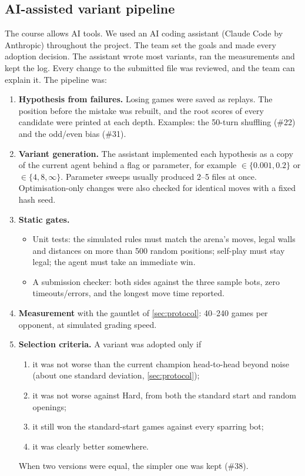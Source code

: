 \subsection{AI-assisted variant pipeline}
\label{sec:pipeline}
The course allows AI tools. We used an AI coding assistant (Claude Code by Anthropic) throughout
the project. The team set the goals and made every adoption decision. The assistant wrote most
variants, ran the measurements and kept the log. Every change to the submitted file was reviewed,
and the team can explain it. The pipeline was:
\begin{enumerate}
  \item \textbf{Hypothesis from failures.} Losing games were saved as replays. The position
        before the mistake was rebuilt, and the root scores of every candidate were printed at
        each depth. Examples: the 50-turn shuffling (\#22) and the odd/even bias (\#31).
  \item \textbf{Variant generation.} The assistant implemented each hypothesis as a copy of the
        current agent behind a flag or parameter, for example 
        $\in\{0.001, 0.2\}$ or  $\in\{4, 8, \infty\}$. Parameter sweeps usually
        produced 2--5 files at once. Optimisation-only changes were also checked for identical
        moves with a fixed hash seed.
  \item \textbf{Static gates.}
        \begin{itemize}
          \item Unit tests: the simulated rules must match the arena's moves, legal walls and
                distances on more than 500 random positions; self-play must stay legal; the
                agent must take an immediate win.
          \item A submission checker: both sides against the three sample bots, zero
                timeouts/errors, and the longest move time reported.
        \end{itemize}
  \item \textbf{Measurement} with the gauntlet of \cref{sec:protocol}: 40--240 games per
        opponent, at simulated grading speed.
  \item \textbf{Selection criteria.} A variant was adopted only if
        \begin{enumerate}[label=(\alph*)]
          \item it was not worse than the current champion head-to-head beyond noise (about one
                standard deviation, \cref{sec:protocol});
          \item it was not worse against Hard, from both the standard start and random openings;
          \item it still won the standard-start games against every sparring bot;
          \item it was clearly better somewhere.
        \end{enumerate}
        When two versions were equal, the simpler one was kept (\#38).
\end{enumerate}

